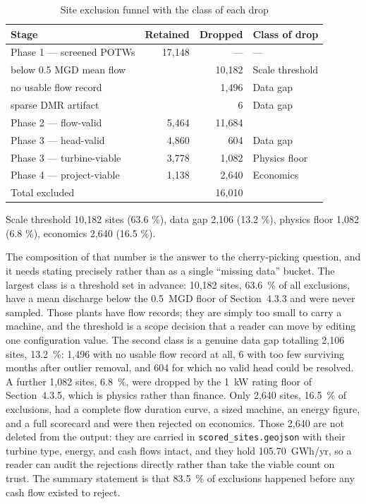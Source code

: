 \documentclass[12pt,letterpaper]{report}
\begin{document}
\begin{table}[htbp]
\centering
\caption{Site exclusion funnel with the class of each drop}
\label{tab:funnel}
\small
\begin{tabular}{@{}lrrl@{}}
\toprule
Stage & Retained & Dropped & Class of drop \\
\midrule
Phase 1 --- screened POTWs        & 17{,}148 & ---       & --- \\
\quad below 0.5 MGD mean flow     &          & 10{,}182  & Scale threshold \\
\quad no usable flow record       &          & 1{,}496   & Data gap \\
\quad sparse DMR artifact         &          & 6         & Data gap \\
Phase 2 --- flow-valid            & 5{,}464  & 11{,}684  & \\
Phase 3 --- head-valid            & 4{,}860  & 604       & Data gap \\
Phase 3 --- turbine-viable        & 3{,}778  & 1{,}082   & Physics floor \\
Phase 4 --- project-viable        & 1{,}138  & 2{,}640   & Economics \\
\midrule
Total excluded                    &          & 16{,}010  & \\
\bottomrule
\end{tabular}

\vspace{0.4em}
{\footnotesize Scale threshold 10,182 sites (63.6 \%), data gap 2,106 (13.2 \%),
physics floor 1,082 (6.8 \%), economics 2,640 (16.5 \%).}
\end{table}

The composition of that number is the answer to the cherry-picking question, and
it needs stating precisely rather than as a single ``missing data'' bucket. The
largest class is a threshold set in advance: 10{,}182 sites, 63.6~\% of all
exclusions, have a mean discharge below the 0.5~MGD floor of Section~4.3.3 and
were never sampled. Those plants have flow records; they are simply too small to
carry a machine, and the threshold is a scope decision that a reader can move by
editing one configuration value. The second class is a genuine data gap totalling
2{,}106 sites, 13.2~\%: 1{,}496 with no usable flow record at all, 6 with too few
surviving months after outlier removal, and 604 for which no valid head could be
resolved. A further 1{,}082 sites, 6.8~\%, were dropped by the 1~kW rating floor
of Section~4.3.5, which is physics rather than finance. Only 2{,}640 sites,
16.5~\% of exclusions, had a
complete flow duration curve, a sized machine, an energy figure, and a full
scorecard and were then rejected on economics. Those 2{,}640 are not deleted from
the output: they are carried in \texttt{scored\_sites.geojson} with their turbine
type, energy, and cash flows intact, and they hold 105.70~GWh/yr, so a reader can
audit the rejections directly rather than take the viable count on trust. The
summary statement is that 83.5~\% of exclusions happened before any cash flow
existed to reject.
\end{document}
